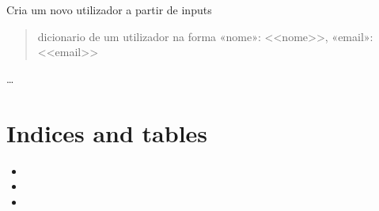\documentclass[letterpaper,10pt,portuges]{sphinxmanual}
\begin{document}
\begin{fulllineitems}
\label{\detokenize{utilizadores:utilizadores.cria_novo_utilizador}}
\pysigstartsignatures
{}
\pysigstopsignatures
\sphinxAtStartPar
Cria um novo utilizador a partir de inputs
\begin{quote}\begin{description}
\sphinxAtStartPar
dicionario de um utilizador na forma
«nome»: \textless{}\textless{}nome\textgreater{}\textgreater{}, «email»: \textless{}\textless{}email\textgreater{}\textgreater{}

\end{description}\end{quote}

\end{fulllineitems}


\begin{fulllineitems}
\label{\detokenize{utilizadores:utilizadores.imprime_lista_de_utilizadores}}
\pysigstartsignatures
{}
\pysigstopsignatures
\sphinxAtStartPar
…

\end{fulllineitems}



\chapter{Indices and tables}
\label{\detokenize{index:indices-and-tables}}\begin{itemize}
\item {} 
\sphinxAtStartPar
{}

\item {} 
\sphinxAtStartPar
{}

\item {} 
\sphinxAtStartPar
{}

\end{itemize}
\end{document}
